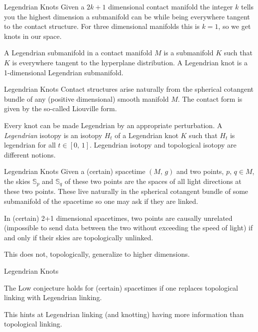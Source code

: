 \documentclass{beamer}
\begin{document}
    \begin{frame}{Legendrian Knots}
        Given a $2k+1$ dimensional contact manifold the integer $k$ tells you
        the highest dimension a submanifold can be while being everywhere
        tangent to the contact structure. For three dimensional manifolds this
        is $k=1$, so we get knots in our space.
        \begin{definition}
            A Legendrian submanifold in a contact manifold $M$ is a submanifold
            $K$ such that $K$ is everywhere tangent to the hyperplane
            distribution. A Legendrian knot is a 1-dimensional Legendrian
            submanifold.
        \end{definition}
    \end{frame}
    \begin{frame}{Legendrian Knots}
        Contact structures arise naturally from the spherical cotangent bundle
        of any (positive dimensional) smooth manifold $M$. The contact form is
        given by the so-called Liouville form.
        \par\hfill\par
        Every knot can be made Legendrian by an appropriate perturbation. A
        \textit{Legendrian} isotopy is an isotopy $H_{t}$ of a Legendrian knot
        $K$ such that $H_{t}$ is legendrian for all $t\in[0,\,1]$. Legendrian
        isotopy and topological isotopy are different notions.
    \end{frame}
    \begin{frame}{Legendrian Knots}
        Given a (certain) spacetime $(M,\,g)$ and two points, $p,\,q\in{M}$,
        the skies $\mathbb{S}_{p}$ and $\mathbb{S}_{q}$ of these two points
        are the spaces of all light directions at these two points. These live
        naturally in the spherical cotangent bundle of some submanifold of the
        spacetime so one may ask if they are linked.
        \begin{theorem}
            In (certain) 2+1 dimensional spacetimes, two points are causally
            unrelated (impossible to send data between the two without exceeding
            the speed of light) if and only if their skies are topologically
            unlinked.
        \end{theorem}
        This does not, topologically, generalize to higher dimensions.
    \end{frame}
    \begin{frame}{Legendrian Knots}
        \begin{theorem}
            The Low conjecture holds for (certain) spacetimes if one replaces
            topological linking with Legendrian linking.
        \end{theorem}
        This hints at Legendrian linking (and knotting) having more information
        than topological linking.
    \end{frame}
\end{document}
